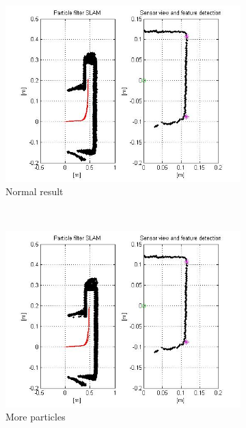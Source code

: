\documentclass[12pt]{article}
\begin{document}
\begin{figure}[h!]
	\centering
	\begin{subfigure}[b]{0.3\textwidth}
		\includegraphics[width=\textwidth]{normal.jpg}
		\caption{Normal result}
	\end{subfigure}
	~
	\begin{subfigure}[b]{0.3\textwidth}
		\includegraphics[width=\textwidth]{1000particles.jpg}
		\caption{More particles}
	\end{subfigure}
	~
	\begin{subfigure}[b]{0.3\textwidth}

\end{subfigure}
\end{figure}
\end{document}
